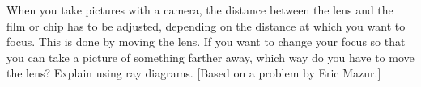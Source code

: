 When you take pictures with a camera, the distance
between the lens and the film or chip has to be adjusted, depending
on the distance at which you want to focus. This is done by
moving the lens. If you want to change your focus so that
you can take a picture of something farther away, which way
do you have to move the lens? Explain using ray diagrams.
[Based on a problem by Eric Mazur.]
